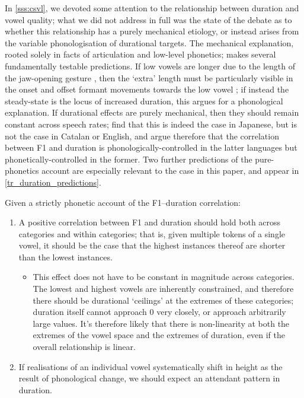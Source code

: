 In \cref{sss:csvl}, we devoted some attention to the relationship between duration and vowel quality; what we did not address in full was the state of the debate as to whether this relationship has a purely mechanical etiology, or instead arises from the variable phonologisation of durational targets. The mechanical explanation, rooted solely in facts of articulation and low-level phonetics; makes several fundamentally testable predictions. If low vowels are longer due to the length of the jaw-opening gesture \citep{Lehiste1970}, then the `extra' length must be particularly visible in the onset and offset formant movements towards the low vowel \citep{Lisker1974}; if instead the steady-state is the locus of increased duration, this argues for a phonological explanation. If durational effects are purely mechanical, then they should remain constant across speech rates; \cite{Sole2010} find that this is indeed the case in Japanese, but is not the case in Catalan or English, and argue therefore that the correlation between F1 and duration is phonologically-controlled in the latter languages but phonetically-controlled in the former. Two further predictions of the pure-phonetics account are especially relevant to the case in this paper, and appear in \cref{tr_duration_predictions}.

\begin{example}Given a strictly phonetic account of the F1–duration correlation:\label{tr_duration_predictions}
\begin{enumerate}
  \item A positive correlation between F1 and duration should hold both across categories and within categories; that is, given multiple tokens of a single vowel, it should be the case that the highest instances thereof are shorter than the lowest instances.
    \begin{itemize}
  \item This effect does not have to be constant in magnitude across categories. The lowest and highest vowels are inherently constrained, and therefore there should be durational `ceilings' at the extremes of these categories; duration itself cannot approach 0 very closely, or approach arbitrarily large values. It's therefore likely that there is non-linearity at both the extremes of the vowel space and the extremes of duration, even if the overall relationship is linear.
\end{itemize}
  \item If realisations of an individual vowel systematically shift in height as the result of phonological change, we should expect an attendant pattern in duration.
    \end{enumerate}
\end{example}

